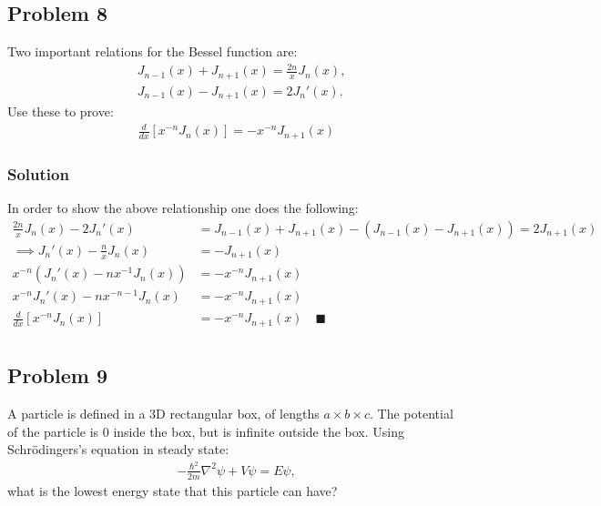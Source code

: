\subsection*{Problem 8}
Two important relations for the Bessel function are:
\begin{align*}
    &J_{n-1}(x) + J_{n+1}(x) = \frac{2n}{x}J_n(x),\\
    &J_{n-1}(x) - J_{n+1}(x) = 2J_n'(x).
\end{align*}Use these to prove:
\begin{align*}
    \frac{d}{dx}\left[x^{-n}J_n(x)\right] = -x^{-n}J_{n + 1}(x)
\end{align*}

\subsubsection*{Solution}
In order to show the above relationship one does the following:
\begin{align*}
    \frac{2n}{x}J_n(x) - 2J_n'(x) &= J_{n-1}(x) + J_{n+1}(x) -\left(J_{n-1}(x) - J_{n+1}(x)\right)= 2J_{n+1}(x)\\
    \implies J_n'(x)-\frac{n}{x}J_n(x) &= -J_{n+1}(x)\\
    x^{-n}\left(J_n'(x) - nx^{-1}J_n(x)\right) &= -x^{-n}J_{n+1}(x)\\
    x^{-n}J_n'(x) - nx^{-n-1}J_n(x) &= -x^{-n}J_{n+1}(x)\\
    \frac{d}{dx}\left[x^{-n}J_n(x)\right] &= -x^{-n}J_{n+1}(x)\quad\blacksquare\\
\end{align*}

\subsection*{Problem 9}
A particle is defined in a 3D rectangular box, of lengths $a \times b \times c$. The potential of the particle is 0 inside the box, but is infinite outside the box.
Using Schrödingers's equation in steady state:
\begin{align*}
    -\frac{\hbar^2}{2m}\nabla^2\psi + V\psi= E\psi,
\end{align*}what is the lowest energy state that this particle can have?

